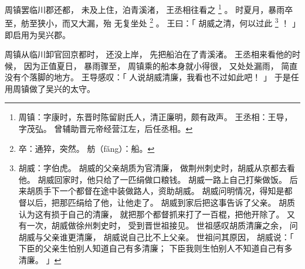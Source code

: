 
\switchcolumn*[\section{}]

周镇罢临川郡还都，
未及上住，泊青溪渚，
王丞相往看之%
\footnote{%
    周镇：字康时，东晋时陈留尉氏人，清正廉明，颇有政声。
    王丞相：王导，字茂弘。
            曾辅助晋元帝经营江左，后任丞相。
}%
。
时夏月，暴雨卒至，舫至狭小，而又大漏，殆
无复坐处%
\footnote{%
    卒：通猝，突然。
    舫（fǎng）：船。
}%
。
王曰：「
    胡威之清，何以过此%
    \footnote{%
        胡威：字伯虎。
              胡威的父亲胡质为官清廉，
              做荆州刺史时，胡威从京都去看他。
              胡威回家时，他只给了一匹绢做口粮钱。
              胡威一路上自己打柴做饭。
              后来胡质手下一个都督在途中装做路人，资助胡威。
              胡威问明情况，得知是都督以后，把那匹绢给了他，让他走了。
              胡威到家后把这事告诉了父亲。
              胡质认为这有损于自己的清廉，
              就把那个都督抓来打了一百棍，把他开除了。
              又有一次，胡威做徐州刺史时，
              受到晋世祖接见。
              世祖感叹胡质清廉之余，
              问胡威与父亲谁更清廉，
              胡威说自己比不上父亲。
              世祖问其原因，
              胡威说：「
                  下臣的父亲生怕别人知道自己有多清廉；
                  下臣我则生怕别人不知道自己有多清廉。
              」
    }%
    ！
」
即启用为吴兴郡。

\switchcolumn

周镇从临川卸官回京都时，
还没上岸，
先把船泊在了青溪渚。
王丞相来看他的时候，
因为正值夏日，
暴雨骤至，
周镇乘的船本身就小得很，
又处处漏雨，
简直没有个落脚的地方。
王导感叹：「
    人说胡威清廉，我看也不过如此吧！
」
于是任用周镇做了吴兴的太守。

